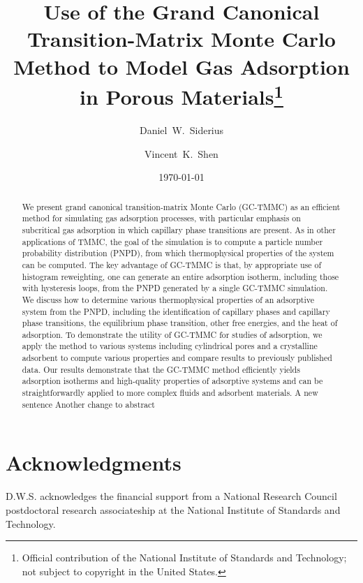 \documentclass[preprint,prb,showkeys]{revtex4}%
\begin{document}
\title{Use of the Grand Canonical Transition-Matrix Monte Carlo Method to Model Gas Adsorption in Porous Materials\footnote{Official contribution of the National Institute of Standards and Technology; not subject to copyright in the United States.}}
\author{Daniel~W.~Siderius}
\author{Vincent~K.~Shen}


\date{\today}

\begin{abstract}
  We present grand canonical transition-matrix Monte Carlo (GC-TMMC) as an efficient method for simulating gas adsorption processes, with particular emphasis on subcritical gas adsorption in which capillary phase transitions are present.
  As in other applications of TMMC, the goal of the simulation is to compute a particle number probability distribution (PNPD), from which thermophysical properties of the system can be computed.
  The key advantage of GC-TMMC is that, by appropriate use of histogram reweighting, one can generate an entire adsorption isotherm, including those with hysteresis loops, from the PNPD generated by a single GC-TMMC simulation.
  We discuss how to determine various thermophysical properties of an adsorptive system from the PNPD, including the identification of capillary phases and capillary phase transitions, the equilibrium phase transition, other free energies, and the heat of adsorption.
  To demonstrate the utility of GC-TMMC for studies of adsorption, we apply the method to various systems including cylindrical pores and a crystalline adsorbent to compute various properties and compare results to previously published data.
  Our results demonstrate that the GC-TMMC method efficiently yields adsorption isotherms and high-quality properties of adsorptive systems and can be straightforwardly applied to more complex fluids and adsorbent materials.
  A new sentence
  Another change to abstract
\end{abstract}%

\maketitle

\newpage








\section*{Acknowledgments}
D.W.S. acknowledges the financial support from a National Research Council postdoctoral research associateship at the National Institute of Standards and Technology.

%
%


\end{document}
